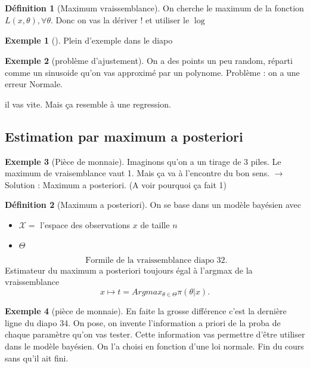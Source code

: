 \documentclass{article}
\theoremstyle{plain}%
\theoremstyle{definition}
\newtheorem{defn}{Définition}[section]
\newtheorem{exmp}{Exemple}[section]
\theoremstyle{remark}
\begin{document}
\begin{defn}[Maximum vraissemblance]
    On cherche le maximum de la fonction $ L(x, \theta ), \forall \theta $. Donc on vas la dériver ! et utiliser le $ \log_{}  $ 
\end{defn}

\begin{exmp}[]
    Plein d'exemple dans le diapo
\end{exmp}

\begin{exmp}[problème d'ajustement]
    On a des points un peu random, réparti comme un sinusoide qu'on vas approximé par un polynome. Problème : on a une erreur Normale.

    il vas vite. Mais ça resemble à une regression.
\end{exmp}

\subsection{Estimation par maximum a posteriori}
\begin{exmp}[Pièce de monnaie]
    Imaginons qu'on a un tirage de 3 piles. Le maximum de vraisemblance vaut 1. Mais ça va à l'encontre du bon sens. $\rightarrow$ Solution : Maximum a posteriori. (A voir pourquoi ça fait 1)
\end{exmp}

\begin{defn}[Maximum a posteriori]
    On se base dans un modèle bayésien avec \begin{itemize}
        \item $ \mathcal{X}= $ l'espace des observations $ x $ de taille $ n $ 
        \item $ \Theta  $ 
    \end{itemize}
    
    \[
        \text{ Formile de la vraissemblance diapo 32}
    .\]
    Estimateur du maximum a posteriori toujours égal à l'argmax de la vraissemblance 
    \[
        x \mapsto t = Argmax_{\theta \in \Theta } \pi (\theta |x)
    .\]
    
\end{defn}
\begin{exmp}[pièce de monnaie]
    En faite la grosse différence c'est la dernière ligne du diapo 34. On pose, on invente l'information a priori de la proba de chaque paramètre qu'on vas tester. Cette information vas permettre d'être utiliser dans le modèle bayésien. On l'a choisi en fonction d'une loi normale. Fin du cours sans qu'il ait fini.
\end{exmp}
\end{document}
